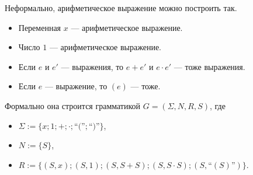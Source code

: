 \documentclass[12pt,a4paper]{article}
\begin{document}
    \begin{example}
        Неформально, арифметическое выражение можно построить так.
        \begin{itemize}
            \item Переменная $x$ --- арифметическое выражение.
            \item Число $1$ --- арифметическое выражение.
            \item Если $e$ и $e'$ --- выражения, то $e + e'$ и $e \cdot e'$ --- тоже выражения.
            \item Если $e$ --- выражение, то $(e)$ --- тоже.
        \end{itemize}

        Формально она строится грамматикой $G = (\Sigma, N, R, S)$, где
        \begin{itemize}
            \item $\Sigma := \{x; 1; {+}; {\cdot}; \text{``(''}; \text{``)''}\}$,
            \item $N := \{S\}$,
            \item $R := \{(S, x); (S, 1); (S, S+S); (S, S \cdot S); (S, \text{``}(S)\text{''})\}$.
        \end{itemize}
    \end{example}

\end{document}
